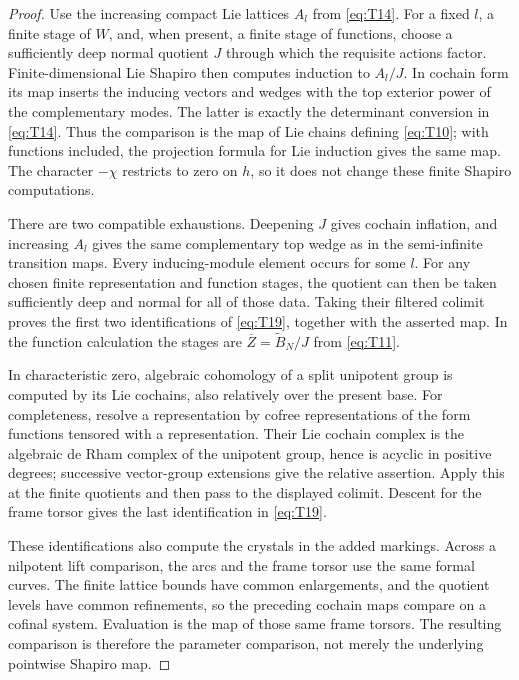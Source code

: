 \documentclass[11pt]{article}
\numberwithin{equation}{section}
\theoremstyle{definition}
\theoremstyle{remark}
\begin{document}
\begin{proof}
Use the increasing compact Lie lattices $A_l$ from \eqref{eq:T14}.
For a fixed $l$, a finite stage of $W$, and, when present, a finite stage
of functions, choose a sufficiently deep normal quotient $J$ through
which the requisite actions factor.  Finite-dimensional Lie Shapiro then
computes induction to $A_l/J$.  In cochain form its map inserts the
inducing vectors and wedges with the top exterior power of the
complementary modes.  The latter is exactly the determinant conversion
in \eqref{eq:T14}.  Thus the comparison is the map of Lie chains defining
\eqref{eq:T10}; with functions included, the projection formula for Lie
induction gives the same map.  The character $-\chi$ restricts to zero on
$h$, so it does not change these finite Shapiro computations.

There are two compatible exhaustions.  Deepening $J$ gives cochain
inflation, and increasing $A_l$ gives the same complementary top wedge as
in the semi-infinite transition maps.  Every inducing-module element
occurs for some $l$.  For any chosen finite representation and function
stages, the quotient can then be taken sufficiently deep and normal for
all of those data.  Taking their filtered colimit proves the first two
identifications of \eqref{eq:T19}, together with the asserted map.  In
the function calculation the stages are
$\overline Z=\widetilde B_N/J$ from \eqref{eq:T11}.

In characteristic zero, algebraic cohomology of a split unipotent group
is computed by its Lie cochains, also relatively over the present base.
For completeness, resolve a representation by cofree representations of
the form functions tensored with a representation.  Their Lie cochain
complex is the algebraic de Rham complex of the unipotent group, hence is
acyclic in positive degrees; successive vector-group extensions give
the relative assertion.  Apply this at the finite quotients and then
pass to the displayed colimit.  Descent for the frame torsor gives the
last identification in \eqref{eq:T19}.

These identifications also compute the crystals in the added markings.
Across a nilpotent lift comparison, the arcs and the frame torsor use the
same formal curves.  The finite lattice bounds have common enlargements,
and the quotient levels have common refinements, so the preceding
cochain maps compare on a cofinal system.  Evaluation is the map of those
same frame torsors.  The resulting comparison is therefore the
parameter comparison, not merely the underlying pointwise Shapiro map.
\end{proof}
\end{document}

